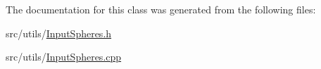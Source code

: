 The documentation for this class was generated from the following files\-:\begin{DoxyCompactItemize}
\item 
src/utils/\hyperlink{InputSpheres_8h}{Input\-Spheres.\-h}\item 
src/utils/\hyperlink{InputSpheres_8cpp}{Input\-Spheres.\-cpp}\end{DoxyCompactItemize}
